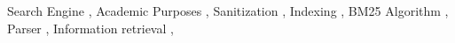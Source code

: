 \documentclass{ceurart}
\begin{document}
\begin{keywords}
  Search Engine \sep
  Academic Purposes \sep
  Sanitization \sep
  Indexing \sep
  BM25 Algorithm \sep
  Parser \sep
  Information retrieval \sep
\end{keywords}

\maketitle



















\end{document}
